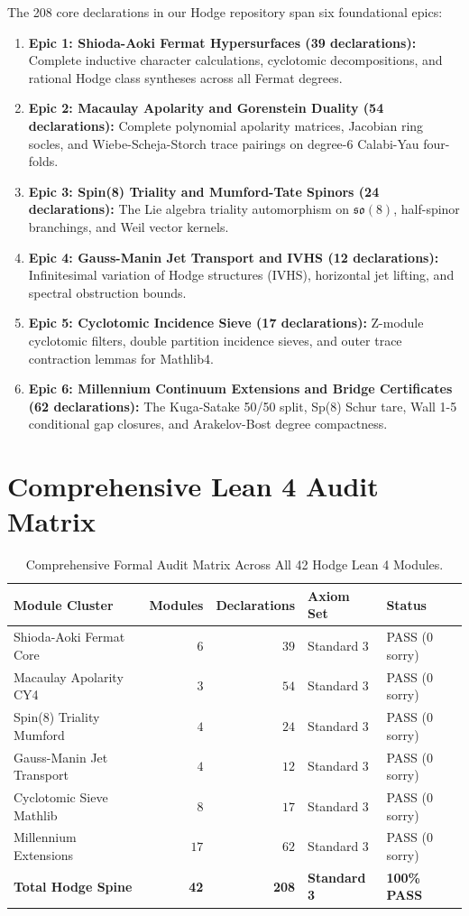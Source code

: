 \documentclass[11pt,a4paper]{article}
\theoremstyle{definition}
\begin{document}
The 208 core declarations in our Hodge repository span six foundational epics:
\begin{enumerate}
  \item \textbf{Epic 1: Shioda-Aoki Fermat Hypersurfaces (39 declarations):} Complete inductive character calculations, cyclotomic decompositions, and rational Hodge class syntheses across all Fermat degrees.
  \item \textbf{Epic 2: Macaulay Apolarity and Gorenstein Duality (54 declarations):} Complete polynomial apolarity matrices, Jacobian ring socles, and Wiebe-Scheja-Storch trace pairings on degree-6 Calabi-Yau four-folds.
  \item \textbf{Epic 3: Spin(8) Triality and Mumford-Tate Spinors (24 declarations):} The Lie algebra triality automorphism on $\mathfrak{so}(8)$, half-spinor branchings, and Weil vector kernels.
  \item \textbf{Epic 4: Gauss-Manin Jet Transport and IVHS (12 declarations):} Infinitesimal variation of Hodge structures (IVHS), horizontal jet lifting, and spectral obstruction bounds.
  \item \textbf{Epic 5: Cyclotomic Incidence Sieve (17 declarations):} Z-module cyclotomic filters, double partition incidence sieves, and outer trace contraction lemmas for Mathlib4.
  \item \textbf{Epic 6: Millennium Continuum Extensions and Bridge Certificates (62 declarations):} The Kuga-Satake 50/50 split, Sp(8) Schur tare, Wall 1-5 conditional gap closures, and Arakelov-Bost degree compactness.
\end{enumerate}

\section{Comprehensive Lean 4 Audit Matrix}

\begin{table}[htbp]
\centering
\small
\begin{tabular}{lrrll}
\toprule
\textbf{Module Cluster} & \textbf{Modules} & \textbf{Declarations} & \textbf{Axiom Set} & \textbf{Status} \\
\midrule
Shioda-Aoki Fermat Core & $6$ & $39$ & Standard 3 & PASS (0 sorry) \\
Macaulay Apolarity CY4 & $3$ & $54$ & Standard 3 & PASS (0 sorry) \\
Spin(8) Triality Mumford & $4$ & $24$ & Standard 3 & PASS (0 sorry) \\
Gauss-Manin Jet Transport & $4$ & $12$ & Standard 3 & PASS (0 sorry) \\
Cyclotomic Sieve Mathlib & $8$ & $17$ & Standard 3 & PASS (0 sorry) \\
Millennium Extensions & $17$ & $62$ & Standard 3 & PASS (0 sorry) \\
\midrule
\textbf{Total Hodge Spine} & \textbf{42} & \textbf{208} & \textbf{Standard 3} & \textbf{100\% PASS} \\
\bottomrule
\end{tabular}
\caption{Comprehensive Formal Audit Matrix Across All 42 Hodge Lean 4 Modules.}
\end{table}
\end{document}
